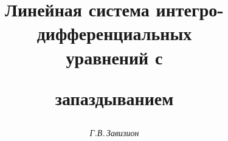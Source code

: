 

 


% 


 


\newcommand{\re}{\operatorname{Re}} 


\newcommand{\diag}{\operatorname{diag}} 


\newcommand{\tts}[1]{} 


 




\setcounter{page}{64} 












 


\author{\it Г.В.\,Завизион} 




\title{Линейная система интегро-дифференциальных\\ уравнений с 


запаздыванием} 


 


\date{} 




\pagestyle{plain} %


 




\maketitle 


